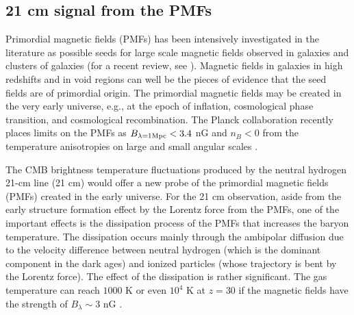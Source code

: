 \documentclass{PoS}
\begin{document}
\subsection{21 cm signal from the PMFs}

Primordial magnetic fields (PMFs) has been intensively investigated in
the literature as possible seeds for large scale magnetic fields
observed in galaxies and clusters of galaxies (for a recent review, see
\cite{2013A&ARv..21...62D}).  Magnetic fields in galaxies in high
redshifts \cite{2008Natur.454..302B} and in void regions
\cite{2010Sci...328...73N,2010ApJ...722L..39A,2013ApJ...771L..42T} can
well be the pieces of evidence that the seed fields are of primordial
origin.  The primordial magnetic fields may be created in the very
early universe, e.g., at the epoch of inflation, cosmological phase
transition, and cosmological recombination.  
The Planck collaboration
recently places limits on the PMFs as $B_{\lambda=1{\rm Mpc}} < 3.4$ nG and $n_B<0$
from the temperature anisotropies on large and small angular scales
\cite{2013arXiv1303.5076P}. 

The CMB brightness temperature fluctuations produced by the neutral
hydrogen 21-cm line (21 cm) would offer a new probe of the primordial
magnetic fields (PMFs) created in the early universe. For the 21 cm
observation, aside from the early structure formation effect by the
Lorentz force from the PMFs, one of the important effects is the
dissipation process of the PMFs that increases the baryon
temperature. The dissipation occurs mainly through the ambipolar
diffusion due to the velocity difference between neutral hydrogen (which
is the dominant component in the dark ages) and ionized particles (whose
trajectory is bent by the Lorentz force).  The effect of the dissipation
is rather significant. The gas temperature can reach $1000$ K or even
$10^4$ K at $z=30$ if the magnetic fields have the strength of
$B_\lambda \sim 3$ nG
\cite{2005MNRAS.356..778S,2006MNRAS.372.1060T,2009ApJ...692..236S,2014JCAP...01..009K}.
\end{document}
